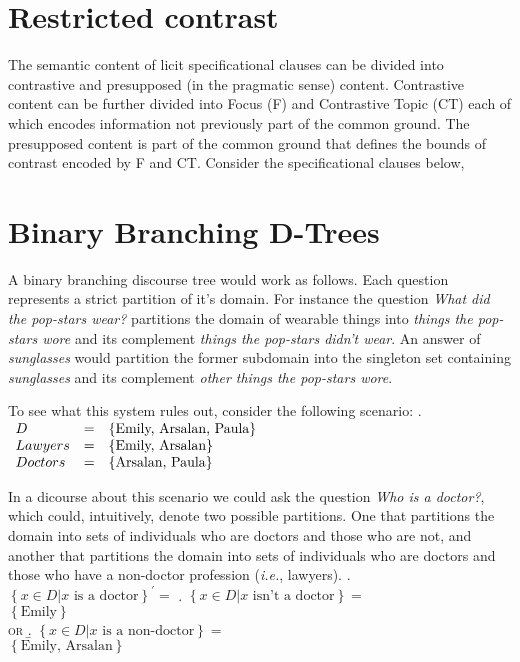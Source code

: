 \documentclass[letterpaper]{article}
\begin{document}
\section{Restricted contrast}
The semantic content of licit specificational clauses can be divided into contrastive and presupposed (in the pragmatic sense) content.
Contrastive content can be further divided into Focus (F) and  Contrastive Topic (CT) each of which encodes information not previously part of the common ground.
The presupposed content is part of the common ground that defines the bounds of contrast encoded by F and CT.
Consider the specificational clauses below,

\section{Binary Branching D-Trees}
A binary branching discourse tree would work as follows.
Each question represents a strict partition of it's domain.
For instance the question \textit{What did the pop-stars wear?} partitions the domain of wearable things into \textit{things the pop-stars wore} and its complement \textit{things the pop-stars didn't wear}.
An answer of \textit{sunglasses} would partition the former subdomain into the singleton set containing \textit{sunglasses} and its complement \textit{other things the pop-stars wore}.

To see what this system rules out, consider the following scenario:
\ex. $
\begin{array}[t]{lll}
  D & = & \left\{ \text{Emily, Arsalan, Paula} \right\}\\
  Lawyers & = &\left\{ \text{Emily, Arsalan} \right\}\\
  Doctors & = &\left\{ \text{Arsalan, Paula} \right\}
\end{array}
$

In a dicourse about this scenario we could ask the question \textit{Who is a doctor?}, which could, intuitively, denote two possible partitions.
One that partitions the domain  into sets of individuals who are doctors and those who are not, and another that partitions the domain into sets of individuals who are doctors and those who have a non-doctor profession (\textit{i.e.}, lawyers).
\ex. $\left\{x \in D | x \text{ is a doctor} \right\}^\prime =$
\a.\label{good-partition} $\left\{ x \in D | x \text{ isn't a doctor} \right\} =$\\
$\left\{ \text{Emily} \right\}$\\
\textsc{or}
\b.\label{bad-partition} $\left\{ x \in D | x \text{ is a non-doctor} \right\} =$\\
$\left\{ \text{Emily, Arsalan} \right\}$
\end{document}

